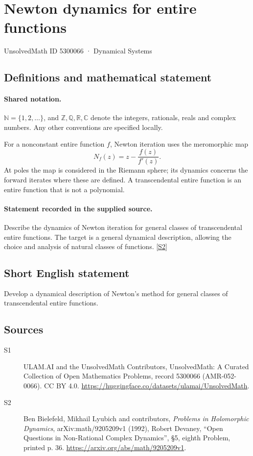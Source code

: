 \documentclass[11pt]{article}
\newcommand{\sref}[2]{\hyperlink{source:#1:#2}{[S#2]}}
\begin{document}
\setcounter{section}{5300065}
\section{Newton dynamics for entire functions}\label{5300066}
{\small\sffamily UnsolvedMath ID 5300066 · Dynamical Systems}
\subsection{Definitions and mathematical statement}

\paragraph{Shared notation.}$\mathbb N=\{1,2,\ldots\}$, and $\mathbb Z,\mathbb Q,\mathbb R,\mathbb C$ denote the integers, rationals, reals and complex numbers. Any other conventions are specified locally.


For a nonconstant entire function $f$, Newton iteration uses the meromorphic map
\[N_f(z)=z-\frac{f(z)}{f'(z)}.\]
At poles the map is considered in the Riemann sphere; its dynamics concerns the forward iterates where these are defined. A transcendental entire function is an entire function that is not a polynomial.
\paragraph{Statement recorded in the supplied source.}
Describe the dynamics of Newton iteration for general classes of transcendental entire functions. The target is a general dynamical description, allowing the choice and analysis of natural classes of functions. \sref{5300066}{2}
\subsection{Short English statement}
Develop a dynamical description of Newton’s method for general classes of transcendental entire functions.
\subsection{Sources}
\begin{description}
\item[\hypertarget{source:5300066:1}{S1}] ULAM.AI and the UnsolvedMath Contributors, UnsolvedMath: A Curated Collection of Open Mathematics Problems, record 5300066 (AMR-052-0066). CC BY 4.0. \url{https://huggingface.co/datasets/ulamai/UnsolvedMath}.
\item[\hypertarget{source:5300066:2}{S2}] Ben Bielefeld, Mikhail Lyubich and contributors, \emph{Problems in Holomorphic Dynamics}, arXiv:math/9205209v1 (1992), Robert Devaney, ``Open Questions in Non-Rational Complex Dynamics'', \S5, eighth Problem, printed p. 36. \url{https://arxiv.org/abs/math/9205209v1}.
\end{description}
\label{end:5300066}
\end{document}
